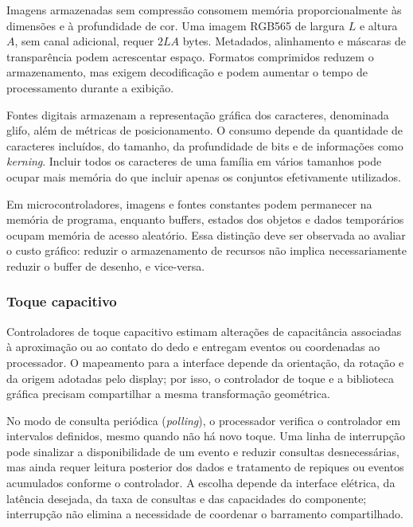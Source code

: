 \documentclass[a4paper,12pt]{article}
\begin{document}
Imagens armazenadas sem compress\~ao consomem mem\'oria proporcionalmente \`as dimens\~oes e \`a profundidade de cor. Uma imagem RGB565 de largura \(L\) e altura \(A\), sem canal adicional, requer \(2LA\) bytes. Metadados, alinhamento e m\'ascaras de transpar\^encia podem acrescentar espa\c{c}o. Formatos comprimidos reduzem o armazenamento, mas exigem decodifica\c{c}\~ao e podem aumentar o tempo de processamento durante a exibi\c{c}\~ao.


Fontes digitais armazenam a representa\c{c}\~ao gr\'afica dos caracteres, denominada glifo, al\'em de m\'etricas de posicionamento. O consumo depende da quantidade de caracteres inclu\'idos, do tamanho, da profundidade de bits e de informa\c{c}\~oes como \emph{kerning}. Incluir todos os caracteres de uma fam\'ilia em v\'arios tamanhos pode ocupar mais mem\'oria do que incluir apenas os conjuntos efetivamente utilizados.


Em microcontroladores, imagens e fontes constantes podem permanecer na mem\'oria de programa, enquanto buffers, estados dos objetos e dados tempor\'arios ocupam mem\'oria de acesso aleat\'orio. Essa distin\c{c}\~ao deve ser observada ao avaliar o custo gr\'afico: reduzir o armazenamento de recursos n\~ao implica necessariamente reduzir o buffer de desenho, e vice-versa.


\subsubsection{Toque capacitivo}


Controladores de toque capacitivo estimam altera\c{c}\~oes de capacit\^ancia associadas \`a aproxima\c{c}\~ao ou ao contato do dedo e entregam eventos ou coordenadas ao processador. O mapeamento para a interface depende da orienta\c{c}\~ao, da rota\c{c}\~ao e da origem adotadas pelo display; por isso, o controlador de toque e a biblioteca gr\'afica precisam compartilhar a mesma transforma\c{c}\~ao geom\'etrica.


No modo de consulta peri\'odica (\emph{polling}), o processador verifica o controlador em intervalos definidos, mesmo quando n\~ao h\'a novo toque. Uma linha de interrup\c{c}\~ao pode sinalizar a disponibilidade de um evento e reduzir consultas desnecess\'arias, mas ainda requer leitura posterior dos dados e tratamento de repiques ou eventos acumulados conforme o controlador. A escolha depende da interface el\'etrica, da lat\^encia desejada, da taxa de consultas e das capacidades do componente; interrup\c{c}\~ao n\~ao elimina a necessidade de coordenar o barramento compartilhado.
\end{document}
